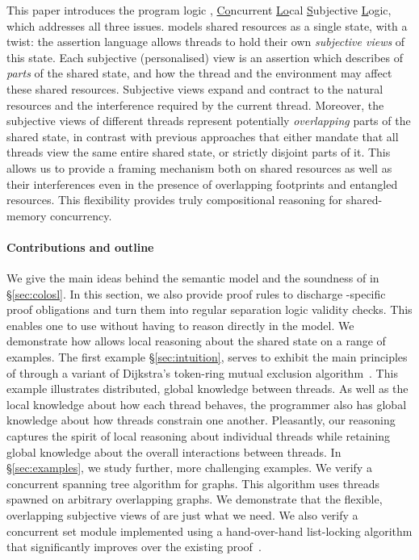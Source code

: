 This paper introduces the program logic \colosl, \underline{Co}ncurrent \underline{Lo}cal
\underline{S}ubjective \underline{L}ogic, which addresses all three issues. \colosl models
shared resources as a single state, with a twist: the assertion
language allows threads to hold their own \emph{subjective views} of
this state. Each subjective (personalised) view is an assertion which
describes of \emph{parts} of the shared state, and how the thread and
the environment may affect these shared resources. Subjective views
expand and contract to the natural resources and the interference
required by the current thread. Moreover, the subjective views of
different threads represent potentially \emph{overlapping} parts of
the shared state, in contrast with previous approaches that either
mandate that all threads view the same entire shared state, or
strictly disjoint parts of it. This allows us to provide a framing
mechanism both on shared resources as well as their interferences even
in the presence of overlapping footprints and entangled
resources. This flexibility provides truly compositional reasoning for
shared-memory concurrency.

\paragraph{Contributions and outline} 
We give the main ideas behind the semantic model and the soundness of
\colosl in \S\ref{sec:colosl}. In this section, we also provide proof
rules to discharge \colosl-specific proof obligations and turn them
into regular separation logic validity checks. This enables one to use
\colosl without having to reason directly in the model. We demonstrate
how \colosl allows local reasoning about the shared state on a range
of examples.  The first example \S\ref{sec:intuition}, serves to exhibit the main principles of \colosl through a variant of
Dijkstra's token-ring mutual exclusion
algorithm~\cite{dijkstra74}. This example illustrates distributed,
global knowledge between threads. As well as the local knowledge about
how each thread behaves, the programmer also has global knowledge
about how threads constrain one another. Pleasantly, our reasoning
captures the spirit of local reasoning about individual threads while
retaining global knowledge about the overall interactions between
threads. In \S\ref{sec:examples}, we study further, more challenging
examples. We verify a concurrent spanning tree algorithm for
graphs. This algorithm uses threads spawned on arbitrary overlapping
graphs. We demonstrate that the flexible, overlapping subjective views
of \colosl are just what we need.  We also verify a concurrent set
module implemented using a hand-over-hand list-locking algorithm that
significantly improves over the existing proof~\cite{cap-ecoop10}.
%

